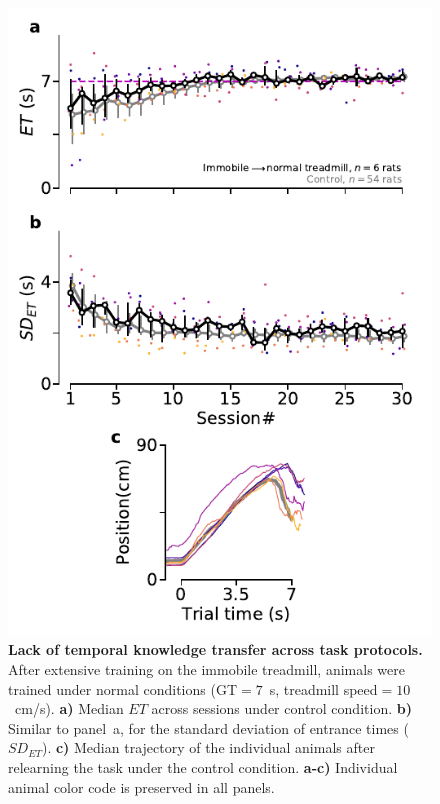 \begin{figure}[bt!]
  \begin{center}
    \includegraphics[scale=1]{ch-appendicies/figures/Imm2CtrlTrd.pdf}
    \caption[Immobile Animals Relearning the Task]
    {\textbf{Lack of temporal knowledge transfer across task protocols.}
    After extensive training on the immobile treadmill, animals were trained under normal conditions (GT$=7$~s, treadmill speed$=10$~cm/s).
    \textbf{a)}
    Median $ET$ across sessions under control condition.
    \textbf{b)}
    Similar to panel~a, for the standard deviation of entrance times ($SD_{ET}$).
    \textbf{c)}
    Median trajectory of the individual animals after relearning the task under the control condition.
    \textbf{a-c)}
    Individual animal color code is preserved in all panels.
    }
    \label{fig:appendix:Imm2Ctrl}
  \end{center}
\end{figure}